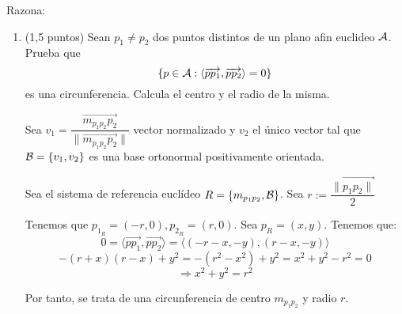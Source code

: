 \documentclass[12pt]{article}
\begin{document}
    \begin{ejercicio}[3 puntos]
        Razona:
        
        \begin{enumerate}
        \item (1,5 puntos) Sean \( p_1\neq p_2 \) dos puntos distintos de un plano afin euclideo \( \mathcal{A} \).
        Prueba que 
        \[
        \{ p \in \mathcal{A} : \langle \overrightarrow{p p_1}, \overrightarrow{p p_2} \rangle = 0 \}
        \]
        es una circunferencia. Calcula el centro y el radio de la misma.

        \noindent

        Sea $v_1=\dfrac{\vec{m_{p_1p_2}p_2}}{\|\vec{m_{p_1p_2}p_2}\|}$ vector normalizado y $v_2$ el único vector tal que $\mathcal{B} = \{v_1,v_2\}$ es una base ortonormal positivamente orientada. 

        \noindent
        Sea el sistema de referencia euclídeo $R=\{m_{p_1p_2},\mathcal{B}\}$. Sea $r:=\dfrac{\|\vec{p_1p_2\|}}{2}$

        Tenemos que $p_{1_R}=(-r,0), p_{2_R}=(r,0)$. Sea $p_R = (x,y)$. Tenemos que: 
        $$0 = \langle\vec{pp_1},\vec{pp_2}\rangle = \langle(-r-x,-y),(r-x,-y)\rangle $$
        $$ -(r+x)(r-x) + y^2 = -(r^2-x^2)+y^2 = x^2 + y^2 - r^2 = 0$$
        $$\Longrightarrow x^2 + y^2 = r^2$$

        Por tanto, se trata de una circunferencia de centro $m_{p_1p_2}$ y radio $r$.
        

\end{enumerate}
\end{ejercicio}
\end{document}
